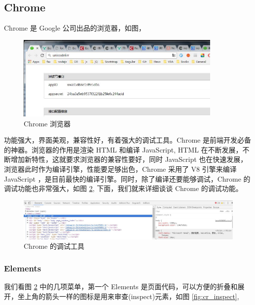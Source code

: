 \documentclass[UTF8]{ctexbook}
\begin{document}
{{        \subsection{Chrome}
          \label{subsec:chrome}
            Chrome 是 Google 公司出品的浏览器，如图，
            \begin{figure}[H]
              \centering
              \includegraphics[width=10cm]{./img/chrome.jpg}
              \caption{Chrome 浏览器}
              \label{fig:chrome}
            \end{figure}
            功能强大，界面美观，兼容性好，有着强大的调试工具。Chrome 是前端开发必备的神器。浏览器的作用是渲染 HTML 和编译 JavaScript, HTML 在不断发展，不断增加新特性，这就要求浏览器的兼容性要好，同时 JavaScript 也在快速发展，浏览器此时作为编译引擎，性能要足够出色，Chrome 采用了 V8 引擎来编译 JavaScript ，是目前最快的编译引擎。同时，除了编译还要能够调试，Chrome 的调试功能也非常强大，如图 \ref{fig:chrome_debug}, 下面，我们就来详细谈谈 Chrome 的调试功能。
            \begin{figure}[H]
              \centering
              \includegraphics[width=12cm]{./img/chrome_debug.jpg}
              \caption{Chrome 的调试工具}
              \label{fig:chrome_debug}
            \end{figure}

            \subsubsection{Elements}
              \label{subsubsec:elements}
                我们看图 \ref{fig:chrome_debug} 中的几项菜单，第一个 Elements 是页面代码，可以方便的折叠和展开，坐上角的箭头一样的图标是用来审查(inspect)元素，如图 \ref{fig:cr_inspect},
                \begin{figure}[H]
                  \centering


\end{figure}}}
\end{document}
